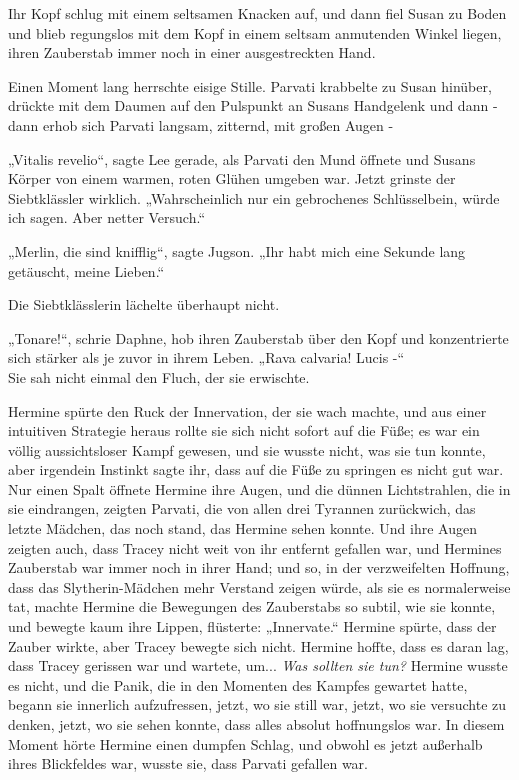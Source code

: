 {Ihr Kopf schlug mit einem seltsamen Knacken auf, und dann fiel Susan zu Boden und blieb regungslos mit dem Kopf in einem seltsam anmutenden Winkel liegen, ihren Zauberstab immer noch in einer ausgestreckten Hand.

Einen Moment lang herrschte eisige Stille. Parvati krabbelte zu Susan hinüber, drückte mit dem Daumen auf den Pulspunkt an Susans Handgelenk und dann - dann erhob sich Parvati langsam, zitternd, mit großen Augen -

„Vitalis revelio“, sagte Lee gerade, als Parvati den Mund öffnete und Susans Körper von einem warmen, roten Glühen umgeben war. Jetzt grinste der Siebtklässler wirklich. „Wahrscheinlich nur ein gebrochenes Schlüsselbein, würde ich sagen. Aber netter Versuch.“

„Merlin, die sind knifflig“, sagte Jugson. „Ihr habt mich eine Sekunde lang getäuscht, meine Lieben.“

Die Siebtklässlerin lächelte überhaupt nicht.

„Tonare!“, schrie Daphne, hob ihren Zauberstab über den Kopf und konzentrierte sich stärker als je zuvor in ihrem Leben. „Rava calvaria! Lucis -“\\ Sie sah nicht einmal den Fluch, der sie erwischte.

Hermine spürte den Ruck der Innervation, der sie wach machte, und aus einer intuitiven Strategie heraus rollte sie sich nicht sofort auf die Füße; es war ein völlig aussichtsloser Kampf gewesen, und sie wusste nicht, was sie tun konnte, aber irgendein Instinkt sagte ihr, dass auf die Füße zu springen es nicht gut war. Nur einen Spalt öffnete Hermine ihre Augen, und die dünnen Lichtstrahlen, die in sie eindrangen, zeigten Parvati, die von allen drei Tyrannen zurückwich, das letzte Mädchen, das noch stand, das Hermine sehen konnte. Und ihre Augen zeigten auch, dass Tracey nicht weit von ihr entfernt gefallen war, und Hermines Zauberstab war immer noch in ihrer Hand; und so, in der verzweifelten Hoffnung, dass das Slytherin-Mädchen mehr Verstand zeigen würde, als sie es normalerweise tat, machte Hermine die Bewegungen des Zauberstabs so subtil, wie sie konnte, und bewegte kaum ihre Lippen, flüsterte: „Innervate.“ Hermine spürte, dass der Zauber wirkte, aber Tracey bewegte sich nicht. Hermine hoffte, dass es daran lag, dass Tracey gerissen war und wartete, um... \emph{Was sollten sie tun?} Hermine wusste es nicht, und die Panik, die in den Momenten des Kampfes gewartet hatte, begann sie innerlich aufzufressen, jetzt, wo sie still war, jetzt, wo sie versuchte zu denken, jetzt, wo sie sehen konnte, dass alles absolut hoffnungslos war. In diesem Moment hörte Hermine einen dumpfen Schlag, und obwohl es jetzt außerhalb ihres Blickfeldes war, wusste sie, dass Parvati gefallen war.

}
